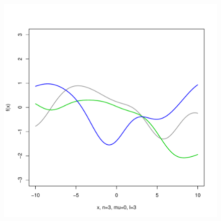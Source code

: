 \documentclass[12pt,letterpaper]{article}
\begin{document}
\begin{figure}
\begin{center}
\includegraphics[scale=0.2]{hw321/n3-m0-l3.pdf}
\end{center}
\end{figure}
\end{document}

